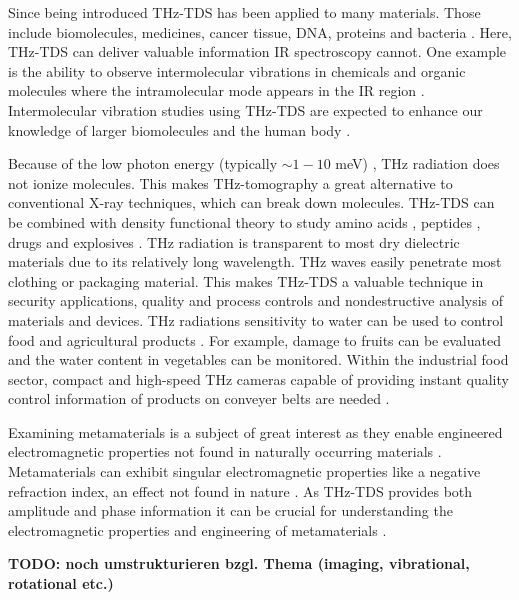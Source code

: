 Since being introduced THz-TDS has been applied to many materials. Those include biomolecules, medicines, cancer tissue, DNA, proteins and bacteria \cite{chenLargeOxidationDependence2005,waltherNoncovalentIntermolecularForces2003,fischerTerahertzTimedomainSpectroscopy2005}. Here, THz-TDS can deliver valuable information IR spectroscopy cannot. One example is the ability to observe intermolecular vibrations in chemicals and organic molecules where the intramolecular mode appears in the IR region \cite{nagaiDirectEvidenceIntermolecular2005}. Intermolecular vibration studies using THz-TDS are expected to enhance our knowledge of larger biomolecules and the human body \cite{tonouchiCuttingedgeTerahertzTechnology2007}. 

Because of the low photon energy (typically $\sim 1-10$ \si{\milli \electronvolt}) \cite{yangBiomedicalApplicationsTerahertz2016}, THz radiation does not ionize molecules. This makes THz-tomography a great alternative to conventional X-ray techniques, which can break down molecules. THz-TDS can be combined with density functional theory \cite{chenCombinationTerahertzSpectroscopy2022} to study amino acids \cite{liaoAminoacidClassificationBased2023}, peptides \cite{neuTerahertzSpectroscopyTetrameric2019}, drugs \cite{kawaseNondestructiveTerahertzImaging2003} and explosives \cite{daviesTerahertzSpectroscopyExplosives2008}. THz radiation is transparent to most dry dielectric materials due to its relatively long wavelength. THz waves easily penetrate most clothing \cite{prokschaTerahertzInsightsFabric2024} or packaging \cite{wietzkeTerahertzSpectroscopyPolymers2011} material. This makes THz-TDS a valuable technique in security applications, quality and process controls and nondestructive analysis of materials and devices. THz radiations sensitivity to water can be used to control food and agricultural products \cite{afsah-hejriTerahertzSpectroscopyImaging2020}. For example, damage to fruits can be evaluated and the water content in vegetables can be monitored. Within the industrial food sector, compact and high-speed THz cameras capable of providing instant quality control information of products on conveyer belts are needed \cite{THzSecurityApplications}. 

Examining metamaterials is a subject of great interest as they enable engineered electromagnetic properties not found in naturally occurring materials \cite{lakamanahalliMetamaterialsComprehensiveReview2024}. Metamaterials can exhibit singular electromagnetic properties like a negative refraction index, an effect not found in nature \cite{ramakrishnaPhysicsApplicationsNegative2008}. As THz-TDS provides both amplitude and phase information it can be crucial for understanding the electromagnetic properties and engineering of metamaterials \cite{rouxPrinciplesApplicationsTHz2014}. 

\textbf{TODO:  noch umstrukturieren bzgl. Thema (imaging, vibrational, rotational etc.)}








